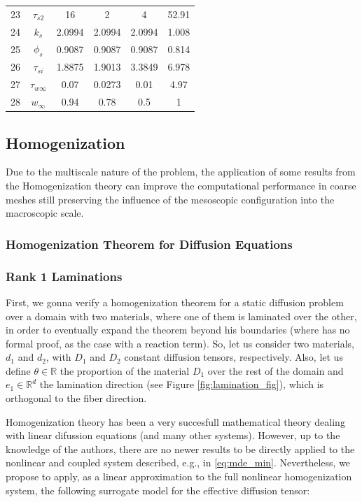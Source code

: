 \begin{table}[H]
\begin{tabular}{@{}cccccc@{}}
		23 & $\tau_{s2}$       & 16      & 2      & 4 & 52.91     \\
		24 & $k_s$             & 2.0994  & 2.0994 & 2.0994 & 1.008 \\
		25 & $\phi_s$          & 0.9087  & 0.9087 & 0.9087 & 0.814 \\
		26 & $\tau_{si}$       & 1.8875  & 1.9013 & 3.3849 & 6.978 \\
		27 & $\tau_{w \infty}$ & 0.07    & 0.0273 & 0.01 & 4.97  \\
		28 & $w_{\infty}$         & 0.94    & 0.78   & 0.5 & 1   \\ \hline
\end{tabular}
\end{table}


\subsection{Homogenization}

Due to the multiscale nature of the problem, the application of some results from the Homogenization theory \cite{homogenization} can improve the computational performance in coarse meshes still preserving the influence of the mesoscopic configuration into the macroscopic scale.

\subsubsection{Homogenization Theorem for Diffusion Equations}

\subsubsection*{Rank 1 Laminations}

First, we gonna verify a homogenization theorem for a static diffusion problem over a domain with two materials, where one of them is laminated over the other, in order to eventually expand the theorem beyond his boundaries (where has no formal proof, as the case with a reaction term). So, let us consider two materials, $d_1$ and $d_2$, with $D_1$ and $D_2$ constant diffusion tensors, respectively. Also, let us define $\theta \in \mathbb{R}$ the proportion of the material $D_1$ over the rest of the domain and $e_1 \in \mathbb{R}^d$ the lamination direction (see Figure \ref{fig:lamination_fig}), which is orthogonal to the fiber direction.

Homogenization theory has been a very succesfull mathematical theory dealing with linear difussion equations (and many other systems). However, up to the knowledge of the authors, there are no newer results to be directly applied to the nonlinear and coupled system described, e.g., in \ref{eq:mde_min}. Nevertheless, we propose to apply, as a linear approximation to the full nonlinear homogenization system, the following surrogate model for the effective diffusion tensor:

